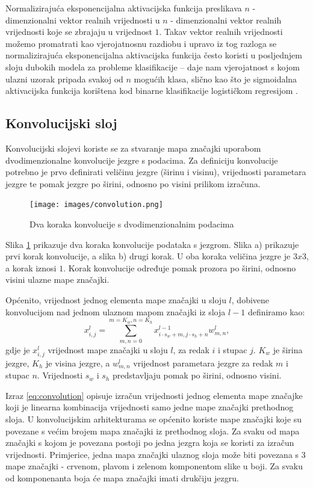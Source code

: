 \documentclass[times, utf8, diplomski, numeric]{fer}
\begin{document}
Normalizirajuća eksponencijalna aktivacijska funkcija preslikava $n$ - dimenzionalni vektor realnih vrijednosti u $n$ - dimenzionalni vektor realnih vrijednosti koje se zbrajaju u vrijednost $1$.
Takav vektor realnih vrijednosti možemo promatrati kao vjerojatnosnu razdiobu i upravo iz tog razloga se normalizirajuća eksponencijalna aktivacijska funkcija često koristi u posljednjem sloju dubokih modela za probleme klasifikacije -- daje nam vjerojatnost s kojom ulazni uzorak pripada svakoj od $n$ mogućih klasa, slično kao što je sigmoidalna aktivacijska funkcija korištena kod binarne klasifikacije logističkom regresijom \citep{seminar:rela}.

\subsection{Konvolucijski sloj}
Konvolucijski slojevi koriste se za stvaranje mapa značajki uporabom dvodimenzionalne konvolucije jezgre s podacima.
Za definiciju konvolucije potrebno je prvo definirati veličinu jezgre (širinu i visinu), vrijednosti parametara jezgre te pomak jezgre po širini, odnosno po visini prilikom izračuna.
\begin{figure}[H]
\centering
\texttt{[image: images/convolution.png]}
\caption{Dva koraka konvolucije s dvodimenzionalnim podacima}
\label{img:convolution}
\end{figure}
Slika \ref{img:convolution} prikazuje dva koraka konvolucije podataka s jezgrom. Slika a) prikazuje prvi korak konvolucije, a slika b) drugi korak. 
U oba koraka veličina jezgre je $3x3$, a korak iznosi $1$. 
Korak konvolucije  određuje pomak prozora po širini, odnosno visini ulazne mape značajki. 

Općenito, vrijednost jednog elementa mape značajki u sloju $l$, dobivene konvolucijom nad jednom ulaznom mapom značajki iz sloja $l-1$ definiramo kao:
\begin{equation}
 x^l_{i,j}=\sum_{m,n=0}^{m=K_w,n=K_h}x^{l-1}_{i \cdot s_w +m, j \cdot s_h +n} w^l_{m, n}, \label{eq:convolution}
\end{equation}
gdje je $x_{i,j}^l$ vrijednost mape značajki u sloju $l$, za redak $i$ i stupac $j$. $K_w$ je širina jezgre, $K_h$ je visina jezgre, a $w^l_{m,n}$ vrijednost parametara jezgre za redak $m$ i stupac $n$.
Vrijednosti $s_w$ i $s_h$ predstavljaju pomak po širini, odnosno visini.

Izraz \ref{eq:convolution} opisuje izračun vrijednosti jednog elementa mape značajke koji je linearna kombinacija vrijednosti samo jedne mape značajki prethodnog sloja.
U konvolucijskim arhitekturama se općenito koriste mape značajki koje su povezane s većim brojem mapa značajki iz prethodnog sloja.
Za svaku od mapa značajki s kojom je povezana postoji po jedna jezgra koja se koristi za izračun vrijednosti.
Primjerice, jedna mapa značajki ulaznog sloja može biti povezana s 3 mape značajki - crvenom, plavom i zelenom komponentom slike u boji.
Za svaku od komponenanta boja će mapa značajki imati drukčiju jezgru.
\end{document}
